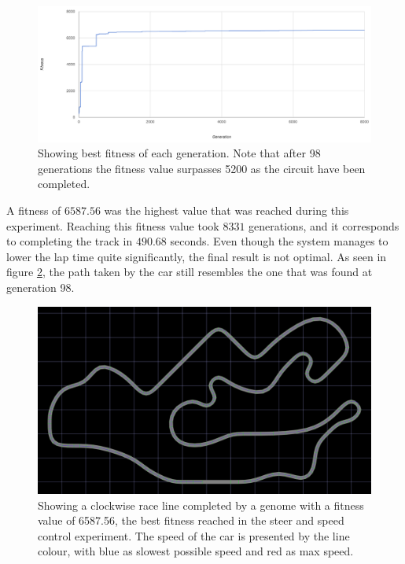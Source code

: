 \begin{figure}[h]
\includegraphics[width=\textwidth]{report/images/graphs/steeringandspeedcontrolrun1}
\centering
\caption{Showing best fitness of each generation. Note that after 98 generations the fitness value surpasses 5200 as the circuit have been completed.}
\label{fig:steerspeeddata}
\end{figure}

A fitness of $6587.56$ was the highest value that was reached during this experiment. Reaching this fitness value took $8331$ generations, and it corresponds to completing the track in $490.68$ seconds. Even though the system manages to lower the lap time quite significantly, the final result is not optimal. As seen in figure \ref{fig:steerspeedline}, the path taken by the car still resembles the one that was found at generation 98.

\begin{figure}[h]
\includegraphics[width=\textwidth]{report/images/normal_generation_6558}
\centering
\caption{Showing a clockwise race line completed by a genome with a fitness value of 6587.56, the best fitness reached in the steer and speed control experiment. The speed of the car is presented by the line colour, with blue as slowest possible speed and red as max speed.}
\label{fig:steerspeedline}
\end{figure}


